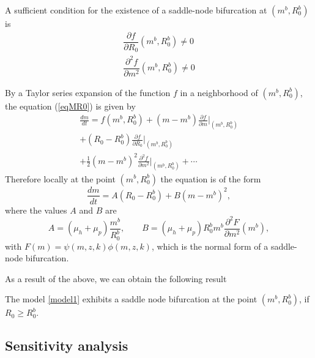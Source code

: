 \documentclass[eng]{MMSB-class-eng}
\begin{document}
{A sufficient condition for the existence of a saddle-node bifurcation at $(m^b,R_0^b)$ is
\begin{equation}
\begin{split}
\dfrac{\partial f }{\partial R_0}(m^b,R_0^b)\neq0\\
\dfrac{\partial^2 f }{\partial m^2}(m^b,R_0^b)\neq0
\end{split}
\end{equation}

By a Taylor series expansion of the function $f$ in a neighborhood of $(m^b,R_0^b)$, the equation (\ref{eqMR0}) is given by
\begin{multline}
	\frac{dm}{dt}=f(m^b,R_0^b)+(m-m^b)\frac{\partial f }{\partial m}\big\vert_{(m^b,R_0^b)}\\ 
	+(R_0-R_0^b){\frac{\partial f }{\partial R_0}\big\vert_{(m^b,R_0^b)}}\\%
+{\frac {1}{2}}(m-m^b)^2{\frac{\partial^2 f }{\partial m^2}}\big\vert_{(m^b,R_0^b)}%
	+\cdots 
\end{multline}
Therefore locally at the point $(m^b,R_0^b)$ the equation is of the form
\begin{equation}
\dfrac{dm}{dt}=A(R_0- R_0^b)+B(m- m^b)^2,
\end{equation}
where the values $A$ and $B$ are
\begin{equation}
A=(\mu_h +\mu_p)\frac{ m^b}{ R_0^b}, \qquad  B=(\mu_h + \mu_p) R_0^b  m^b \frac{\partial^2 F}{\partial m^2}( m^b),
\end{equation}
with $F(m)= \psi(m,z,k)\phi(m,z, k)$,
which is the normal form of a saddle-node bifurcation.

{\color{blue}
As a result of the above, we can obtain the following result
\begin{theorem}
	The model \eqref{model1} exhibits a saddle node bifurcation at the point $(m^b,R_0^b)$, if $R_0 \geq R_0^b$.
\end{theorem}
}

}


\subsection{Sensitivity analysis}
	
\end{document}
